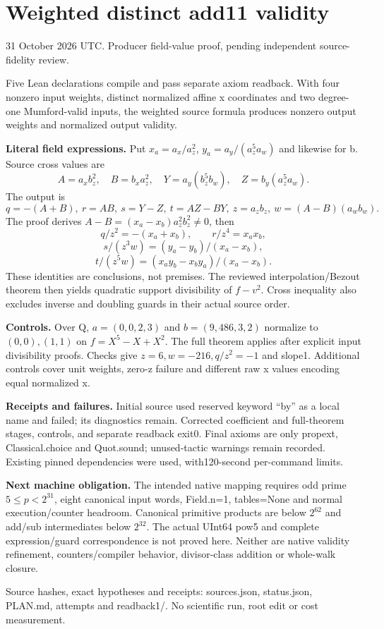 \documentclass[11pt]{article}
\begin{document}
\section*{Weighted distinct add11 validity}
31 October 2026 UTC. Producer field-value proof, pending independent source-fidelity review.

Five Lean declarations compile and pass separate axiom readback. With four nonzero input weights, distinct normalized affine x coordinates and two degree-one Mumford-valid inputs, the weighted source formula produces nonzero output weights and normalized output validity.

\textbf{Literal field expressions.} Put $x_a=a_x/a_z^2$, $y_a=a_y/(a_z^5a_w)$ and likewise for b. Source cross values are
\[ A=a_xb_z^2,\quad B=b_xa_z^2,\quad Y=a_y(b_z^5b_w),\quad Z=b_y(a_z^5a_w). \]
The output is
\[q=-(A+B),\ r=AB,\ s=Y-Z,\ t=AZ-BY,\ z=a_zb_z,\ w=(A-B)(a_wb_w).\]
The proof derives $A-B=(x_a-x_b)a_z^2b_z^2\ne0$, then
\[q/z^2=-(x_a+x_b),\qquad r/z^4=x_ax_b,\]
\[s/(z^3w)=(y_a-y_b)/(x_a-x_b),\]
\[t/(z^5w)=(x_ay_b-x_by_a)/(x_a-x_b).\]
These identities are conclusions, not premises. The reviewed interpolation/Bezout theorem then yields quadratic support divisibility of $f-v^2$. Cross inequality also excludes inverse and doubling guards in their actual source order.

\textbf{Controls.} Over Q, $a=(0,0,2,3)$ and $b=(9,486,3,2)$ normalize to $(0,0),(1,1)$ on $f=X^5-X+X^2$. The full theorem applies after explicit input divisibility proofs. Checks give $z=6,w=-216,q/z^2=-1$ and slope1. Additional controls cover unit weights, zero-z failure and different raw x values encoding equal normalized x.

\textbf{Receipts and failures.} Initial source used reserved keyword ``by'' as a local name and failed; its diagnostics remain. Corrected coefficient and full-theorem stages, controls, and separate readback exit0. Final axioms are only propext, Classical.choice and Quot.sound; unused-tactic warnings remain recorded. Existing pinned dependencies were used, with120-second per-command limits.

\textbf{Next machine obligation.} The intended native mapping requires odd prime $5\le p<2^{31}$, eight canonical input words, Field.n=1, tables=None and normal execution/counter headroom. Canonical primitive products are below $2^{62}$ and add/sub intermediates below $2^{32}$. The actual UInt64 pow5 and complete expression/guard correspondence is not proved here. Neither are native validity refinement, counters/compiler behavior, divisor-class addition or whole-walk closure.

Source hashes, exact hypotheses and receipts: sources.json, status.json, PLAN.md, attempts and readback1/. No scientific run, root edit or cost measurement.
\end{document}
